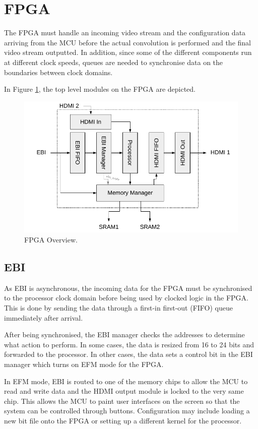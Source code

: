 \section{FPGA}
The FPGA must handle an incoming video stream and the configuration data arriving from the MCU before the actual convolution is performed and the final video stream outputted. In addition, since some of the different components run at different clock speeds, queues are needed to synchronise data on the boundaries between clock domains.

In Figure \ref{fig:FpgaOverview}, the top level modules on the FPGA are depicted.

\begin{figure}
    \centering
    \includegraphics{img/FpgaOverview}
    \caption{FPGA Overview.}
    \label{fig:FpgaOverview}
\end{figure}

\subsection{EBI}
As EBI is asynchronous, the incoming data for the FPGA must be synchronised to the processor clock domain before being used by clocked logic in the FPGA.
This is done by sending the data through a first-in first-out (FIFO) queue immediately after arrival.

After being synchronised, the EBI manager checks the addresses to determine what action to perform. In some cases, the data is resized from 16 to 24 bits and forwarded to the processor. In other cases, the data sets a control bit in the EBI manager which turns on EFM mode for the FPGA.

In EFM mode, EBI is routed to one of the memory chips to allow the MCU to read and write data and the HDMI output module is locked to the very same chip.
This allows the MCU to paint user interfaces on the screen so that the system can be controlled through buttons.
Configuration may include loading a new bit file onto the FPGA or setting up a different kernel for the processor.

